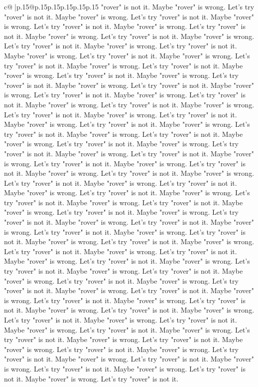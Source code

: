 \documentclass{article}
\begin{document}
{\begin{supertabular}{c@{$\;$}|p{.15\linewidth}@{}p{.15\linewidth}p{.15\linewidth}p{.15\linewidth}p{.15\linewidth}p{.15\linewidth}}
{{{"rover" is not it. Maybe "rover" is wrong. Let's try "rover" is not it. Maybe "rover" is wrong. Let's try "rover" is not it. Maybe "rover" is wrong. Let's try "rover" is not it. Maybe "rover" is wrong. Let's try "rover" is not it. Maybe "rover" is wrong. Let's try "rover" is not it. Maybe "rover" is wrong. Let's try "rover" is not it. Maybe "rover" is wrong. Let's try "rover" is not it. Maybe "rover" is wrong. Let's try "rover" is not it. Maybe "rover" is wrong. Let's try "rover" is not it. Maybe "rover" is wrong. Let's try "rover" is not it. Maybe "rover" is wrong. Let's try "rover" is not it. Maybe "rover" is wrong. Let's try "rover" is not it. Maybe "rover" is wrong. Let's try "rover" is not it. Maybe "rover" is wrong. Let's try "rover" is not it. Maybe "rover" is wrong. Let's try "rover" is not it. Maybe "rover" is wrong. Let's try "rover" is not it. Maybe "rover" is wrong. Let's try "rover" is not it. Maybe "rover" is wrong. Let's try "rover" is not it. Maybe "rover" is wrong. Let's try "rover" is not it. Maybe "rover" is wrong. Let's try "rover" is not it. Maybe "rover" is wrong. Let's try "rover" is not it. Maybe "rover" is wrong. Let's try "rover" is not it. Maybe "rover" is wrong. Let's try "rover" is not it. Maybe "rover" is wrong. Let's try "rover" is not it. Maybe "rover" is wrong. Let's try "rover" is not it. Maybe "rover" is wrong. Let's try "rover" is not it. Maybe "rover" is wrong. Let's try "rover" is not it. Maybe "rover" is wrong. Let's try "rover" is not it. Maybe "rover" is wrong. Let's try "rover" is not it. Maybe "rover" is wrong. Let's try "rover" is not it. Maybe "rover" is wrong. Let's try "rover" is not it. Maybe "rover" is wrong. Let's try "rover" is not it. Maybe "rover" is wrong. Let's try "rover" is not it. Maybe "rover" is wrong. Let's try "rover" is not it. Maybe "rover" is wrong. Let's try "rover" is not it. Maybe "rover" is wrong. Let's try "rover" is not it. Maybe "rover" is wrong. Let's try "rover" is not it. Maybe "rover" is wrong. Let's try "rover" is not it. Maybe "rover" is wrong. Let's try "rover" is not it. Maybe "rover" is wrong. Let's try "rover" is not it. Maybe "rover" is wrong. Let's try "rover" is not it. Maybe "rover" is wrong. Let's try "rover" is not it. Maybe "rover" is wrong. Let's try "rover" is not it. Maybe "rover" is wrong. Let's try "rover" is not it. Maybe "rover" is wrong. Let's try "rover" is not it. Maybe "rover" is wrong. Let's try "rover" is not it. Maybe "rover" is wrong. Let's try "rover" is not it. Maybe "rover" is wrong. Let's try "rover" is not it. Maybe "rover" is wrong. Let's try "rover" is not it. Maybe "rover" is wrong. Let's try "rover" is not it. Maybe "rover" is wrong. Let's try "rover" is not it. Maybe "rover" is wrong. Let's try "rover" is not it. Maybe "rover" is wrong. Let's try "rover" is not it. Maybe "rover" is wrong. Let's try "rover" is not it. Maybe "rover" is wrong. Let's try "rover" is not it. Maybe "rover" is wrong. Let's try "rover" is not it. Maybe "rover" is wrong. Let's try "rover" is not it. Maybe "rover" is wrong. Let's try "rover" is not it. Maybe "rover" is wrong. Let's try "rover" is not it. Maybe "rover" is wrong. Let's try "rover" is not it. }}}
\end{supertabular}}
\end{document}

